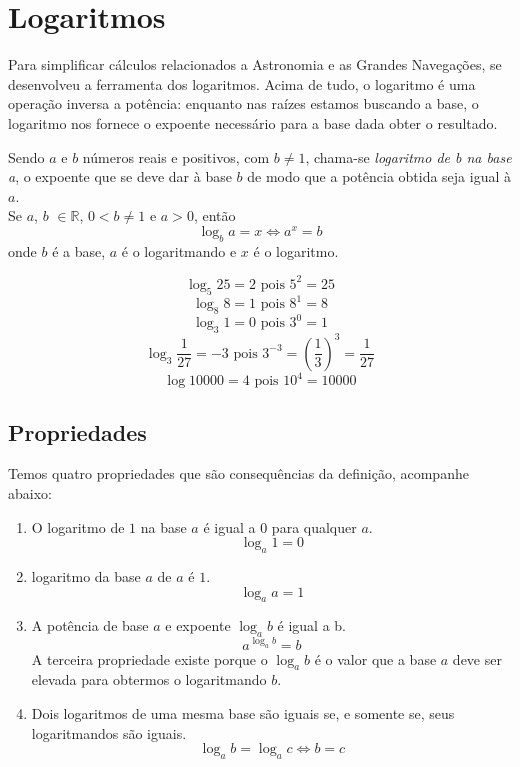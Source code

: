 \chapter{Logaritmos}
Para simplificar cálculos relacionados a Astronomia e as Grandes Navegações, se desenvolveu a ferramenta dos logaritmos. Acima de tudo, o logaritmo é uma operação inversa a potência: enquanto nas raízes estamos buscando a base, o logaritmo nos fornece o expoente necessário para a base dada obter o resultado.
\begin{df}
Sendo $a$ e $b$ números reais e positivos, com $b \neq 1$, chama-se \emph{logaritmo de b na base a}, o expoente que se deve dar à base $b$ de modo que a potência obtida seja igual à $a$. \\ 

Se $a$, $b$ $\in \mathbb{R}$, $0 < b \neq 1$ e $a > 0$, então \[\log_b a = x \Leftrightarrow a^x = b\] onde $b$ é a base, $a$ é o logaritmando e $x$ é o logaritmo.
\end{df}

\begin{exemplo}
\[\log_5 25 = 2 \textrm{ pois } 5^2 = 25\]
\[\log_8 8 = 1 \textrm{ pois } 8^1 = 8\]
\[\log_3 1 = 0 \textrm{ pois } 3^0 = 1\]
\[\log_3  \dfrac{1} {27} = -3 \textrm{ pois } 3^{-3}= (\dfrac {1} {3})^3 = \dfrac {1}{27}\]
\[\log 10000 = 4 \textrm{ pois } 10^4 = 10000\]
\end{exemplo}
\section{Propriedades}
Temos quatro propriedades que são consequências da definição, acompanhe abaixo:

\begin{enumerate}[1.]
\item O logaritmo de $1$ na base $a$ é igual a $0$ para qualquer $a$.\[ \log_a 1 = 0\]
\item logaritmo da base $a$ de $a$ é $1$.\[ \log_a a = 1\]
\item A potência de base $a$ e expoente $\log_a b$  é igual a b.\[ a^{\log_a b} = b \]
A terceira propriedade existe porque o $\log_a b$ é o valor que a base $a$ deve ser elevada para obtermos o logaritmando $b$.
\item Dois logaritmos de uma mesma base são iguais se, e somente se, seus logaritmandos são iguais. \[ \log_a b = \log_a c \Leftrightarrow b = c \]
\end{enumerate}
